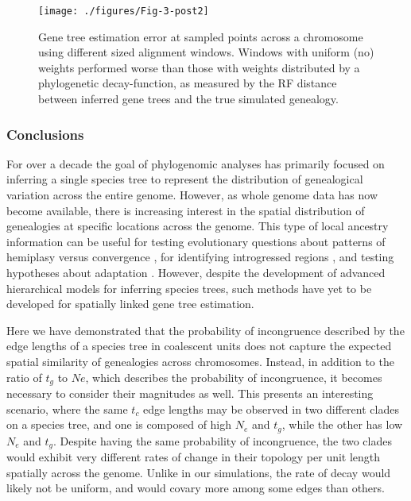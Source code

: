 \documentclass[11pt]{article}
\begin{document}
\begin{figure}
	\centering
		\texttt{[image: ./figures/Fig-3-post2]}
		\caption{
			Gene tree estimation error at sampled points across a chromosome using different sized alignment windows. Windows with uniform (no) weights performed worse than those with weights distributed by a phylogenetic decay-function, as measured by the RF distance between inferred gene trees and the true simulated genealogy. 
		}
\end{figure}


\subsubsection*{Conclusions}
For over a decade the goal of phylogenomic analyses has primarily focused on inferring a single species tree to represent the distribution of genealogical variation across the entire genome. However, as whole genome data has now become available, there is increasing interest in the spatial distribution of genealogies at specific locations across the genome. This type of local ancestry information can be useful for testing evolutionary questions about patterns of hemiplasy versus convergence \citep{guerrero_quantifying_2018}, for identifying introgressed regions \citep{fang_estimating_2020}, and testing hypotheses about adaptation \citep{martin_recombination_2019}. However, despite the development of advanced hierarchical models for inferring species trees, such methods have yet to be developed for spatially linked gene tree estimation.

Here we have demonstrated that the probability of incongruence described by the edge lengths of a species tree in coalescent units does not capture the expected spatial similarity of genealogies across chromosomes. Instead, in addition to the ratio of $t_g$ to $Ne$, which describes the probability of incongruence, it becomes necessary to consider their magnitudes as well. This presents an interesting scenario, where the same $t_c$ edge lengths may be observed in two different clades on a species tree, and one is composed of high $N_e$ and $t_g$, while the other has low $N_e$ and $t_g$. Despite having the same probability of incongruence, the two clades would exhibit very different rates of change in their topology per unit length spatially across the genome. Unlike in our simulations, the rate of decay would likely not be uniform, and would covary more among some edges than others. 
\end{document}
